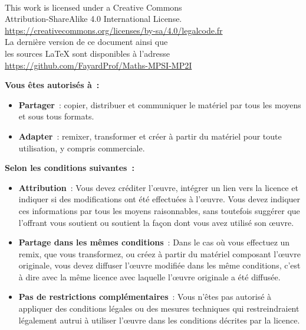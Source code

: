 \documentclass[book]{magnoliaold}
\begin{document}
\begin{center}
  \ccbysa\\
  \vspace{2ex}
  This work is licensed under a Creative Commons\\
  Attribution-ShareAlike 4.0 International License.\\
  \url{https://creativecommons.org/licenses/by-sa/4.0/legalcode.fr}\\
  \vspace{2ex}
  La dernière version de ce document ainsi que\\
  les sources \LaTeX{} sont disponibles à l'adresse\\
  \url{https://github.com/FayardProf/Maths-MPSI-MP2I}
  \end{center}
  \vspace{2ex}
  \begin{center}
  \textbf{Vous êtes autorisés à~:}
  \end{center}
  \vspace{2ex}
  \begin{itemize}
  \item \textbf{Partager}~: copier, distribuer et communiquer le matériel par tous les moyens et sous tous formats.
  \item \textbf{Adapter}~: remixer, transformer et créer à partir du matériel
  pour toute utilisation, y compris commerciale.
  \end{itemize}
  \vspace{2ex}
  \begin{center}
  \textbf{Selon les conditions suivantes~:}
  \end{center}
  \vspace{2ex}
  \begin{itemize}
    \item \textbf{Attribution}~: Vous devez créditer l'œuvre, intégrer un lien vers la licence et indiquer si des modifications ont été effectuées à l'œuvre. Vous devez indiquer ces informations par tous les moyens raisonnables, sans toutefois suggérer que l'offrant vous soutient ou soutient la façon dont vous avez utilisé son œuvre.
    \item \textbf{Partage dans les mêmes conditions}~: Dans le cas où vous effectuez un remix, que vous transformez, ou créez à partir du matériel composant l'œuvre originale, vous devez diffuser l'œuvre modifiée dans les même conditions, c'est à dire avec la même licence avec laquelle l'œuvre originale a été diffusée.
    \item \textbf{Pas de restrictions complémentaires}~: Vous n'êtes pas autorisé à appliquer des conditions légales ou des mesures techniques qui restreindraient légalement autrui à utiliser l'œuvre dans les conditions décrites par la licence.
    \end{itemize}
\end{document}
